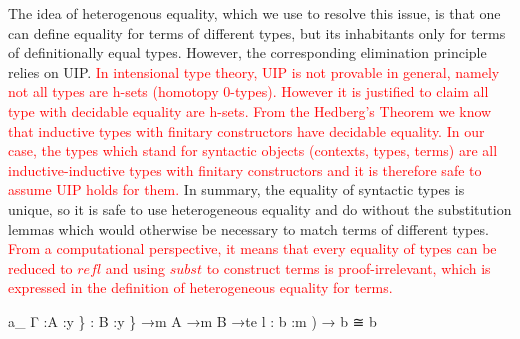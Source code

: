\documentclass{acm_proc_article-sp}
\newcommand{\new}{\textcolor{red}}
\begin{document}
The idea of heterogenous equality, which we use to resolve this issue,
is that one can define equality for terms of different types, but its
inhabitants only for terms of definitionally equal types. However, the
corresponding elimination principle relies on UIP. \new{In intensional type theory, UIP is not provable in general,
  namely not all types are h-sets (homotopy 0-types). However it is
  justified to claim all type with decidable equality are h-sets.
  From the Hedberg's Theorem \cite{hed:98} we know that inductive
  types with finitary constructors have decidable equality. In our
  case, the types which stand for syntactic objects (contexts, types, terms)
  are all inductive-inductive types with finitary constructors and it is
  therefore safe to assume UIP holds for them. }
In summary, the equality of
syntactic types is unique, so it is safe to use heterogeneous equality
and do without the substitution lemmas which would otherwise be
necessary to match terms of different types. \new{From a computational perspective, it means that every equality of types can be reduced to $\mathit{refl}$ and using $\mathit{subst}$ to construct terms is proof-irrelevant, which is expressed in the definition of heterogeneous equality for terms. }


\begin{code}%
\>a\_ \AgdaBound{\{}Γ :\AgdaBound{\{}A :y \} :
         \AgdaBound{\{}B :y \} →m A →m B →te
 l : \AgdaBound{(}b :m ) → b ≅ b
\<%
\end{code}
\end{document}
